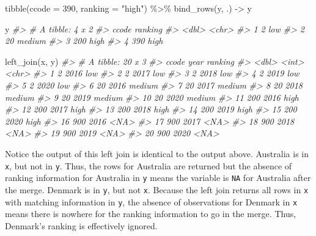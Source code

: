 \documentclass[
  11pt,
]{article}
\newenvironment{Shaded}{\begin{snugshade}}{\end{snugshade}}
\newcommand{\AttributeTok}[1]{\textcolor[rgb]{0.77,0.63,0.00}{#1}}
\newcommand{\CommentTok}[1]{\textcolor[rgb]{0.56,0.35,0.01}{\textit{#1}}}
\newcommand{\DecValTok}[1]{\textcolor[rgb]{0.00,0.00,0.81}{#1}}
\newcommand{\FunctionTok}[1]{\textcolor[rgb]{0.00,0.00,0.00}{#1}}
\newcommand{\NormalTok}[1]{#1}
\newcommand{\OtherTok}[1]{\textcolor[rgb]{0.56,0.35,0.01}{#1}}
\newcommand{\SpecialCharTok}[1]{\textcolor[rgb]{0.00,0.00,0.00}{#1}}
\newcommand{\StringTok}[1]{\textcolor[rgb]{0.31,0.60,0.02}{#1}}
\begin{document}
\begin{Shaded}
\begin{Highlighting}[]
\FunctionTok{tibble}\NormalTok{(}\AttributeTok{ccode =} \DecValTok{390}\NormalTok{,}
       \AttributeTok{ranking =} \StringTok{"high"}\NormalTok{) }\SpecialCharTok{\%\textgreater{}\%}
  \FunctionTok{bind\_rows}\NormalTok{(y, .) }\OtherTok{{-}\textgreater{}}\NormalTok{ y}

\NormalTok{y}
\CommentTok{\#\textgreater{} \# A tibble: 4 x 2}
\CommentTok{\#\textgreater{}   ccode ranking}
\CommentTok{\#\textgreater{}   \textless{}dbl\textgreater{} \textless{}chr\textgreater{}  }
\CommentTok{\#\textgreater{} 1     2 low    }
\CommentTok{\#\textgreater{} 2    20 medium }
\CommentTok{\#\textgreater{} 3   200 high   }
\CommentTok{\#\textgreater{} 4   390 high}

\FunctionTok{left\_join}\NormalTok{(x, y)}
\CommentTok{\#\textgreater{} \# A tibble: 20 x 3}
\CommentTok{\#\textgreater{}    ccode  year ranking}
\CommentTok{\#\textgreater{}    \textless{}dbl\textgreater{} \textless{}int\textgreater{} \textless{}chr\textgreater{}  }
\CommentTok{\#\textgreater{}  1     2  2016 low    }
\CommentTok{\#\textgreater{}  2     2  2017 low    }
\CommentTok{\#\textgreater{}  3     2  2018 low    }
\CommentTok{\#\textgreater{}  4     2  2019 low    }
\CommentTok{\#\textgreater{}  5     2  2020 low    }
\CommentTok{\#\textgreater{}  6    20  2016 medium }
\CommentTok{\#\textgreater{}  7    20  2017 medium }
\CommentTok{\#\textgreater{}  8    20  2018 medium }
\CommentTok{\#\textgreater{}  9    20  2019 medium }
\CommentTok{\#\textgreater{} 10    20  2020 medium }
\CommentTok{\#\textgreater{} 11   200  2016 high   }
\CommentTok{\#\textgreater{} 12   200  2017 high   }
\CommentTok{\#\textgreater{} 13   200  2018 high   }
\CommentTok{\#\textgreater{} 14   200  2019 high   }
\CommentTok{\#\textgreater{} 15   200  2020 high   }
\CommentTok{\#\textgreater{} 16   900  2016 \textless{}NA\textgreater{}   }
\CommentTok{\#\textgreater{} 17   900  2017 \textless{}NA\textgreater{}   }
\CommentTok{\#\textgreater{} 18   900  2018 \textless{}NA\textgreater{}   }
\CommentTok{\#\textgreater{} 19   900  2019 \textless{}NA\textgreater{}   }
\CommentTok{\#\textgreater{} 20   900  2020 \textless{}NA\textgreater{}}
\end{Highlighting}
\end{Shaded}

Notice the output of this left join is identical to the output above. Australia is in \texttt{x}, but not in \texttt{y}. Thus, the rows for Australia are returned but the absence of ranking information for Australia in \texttt{y} means the variable is \texttt{NA} for Australia after the merge. Denmark is in \texttt{y}, but not \texttt{x}. Because the left join returns all rows in \texttt{x} with matching information in \texttt{y}, the absence of observations for Denmark in \texttt{x} means there is nowhere for the ranking information to go in the merge. Thus, Denmark's ranking is effectively ignored.
\end{document}
